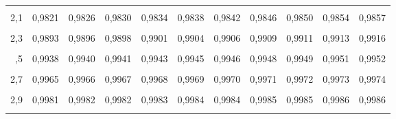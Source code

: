 \documentclass[
  ngerman,
]{article}
\begin{document}
\begin{table}[!h]
{\begin{tabular}{>{}r|rrrrrrrrrr}
\addlinespace
\cellcolor{gray!6}{2,0} & \cellcolor{gray!6}{0,9772} & \cellcolor{gray!6}{0,9778} & \cellcolor{gray!6}{0,9783} & \cellcolor{gray!6}{0,9788} & \cellcolor{gray!6}{0,9793} & \cellcolor{gray!6}{0,9798} & \cellcolor{gray!6}{0,9803} & \cellcolor{gray!6}{0,9808} & \cellcolor{gray!6}{0,9812} & \cellcolor{gray!6}{0,9817}\\
2,1 & 0,9821 & 0,9826 & 0,9830 & 0,9834 & 0,9838 & 0,9842 & 0,9846 & 0,9850 & 0,9854 & 0,9857\\
\cellcolor{gray!6}{2,2} & \cellcolor{gray!6}{0,9861} & \cellcolor{gray!6}{0,9864} & \cellcolor{gray!6}{0,9868} & \cellcolor{gray!6}{0,9871} & \cellcolor{gray!6}{0,9875} & \cellcolor{gray!6}{0,9878} & \cellcolor{gray!6}{0,9881} & \cellcolor{gray!6}{0,9884} & \cellcolor{gray!6}{0,9887} & \cellcolor{gray!6}{0,9890}\\
2,3 & 0,9893 & 0,9896 & 0,9898 & 0,9901 & 0,9904 & 0,9906 & 0,9909 & 0,9911 & 0,9913 & 0,9916\\
\cellcolor{gray!6}{2,4} & \cellcolor{gray!6}{0,9918} & \cellcolor{gray!6}{0,9920} & \cellcolor{gray!6}{0,9922} & \cellcolor{gray!6}{0,9925} & \cellcolor{gray!6}{0,9927} & \cellcolor{gray!6}{0,9929} & \cellcolor{gray!6}{0,9931} & \cellcolor{gray!6}{0,9932} & \cellcolor{gray!6}{0,9934} & \cellcolor{gray!6}{0,9936}\\
\addlinespace
2,5 & 0,9938 & 0,9940 & 0,9941 & 0,9943 & 0,9945 & 0,9946 & 0,9948 & 0,9949 & 0,9951 & 0,9952\\
\cellcolor{gray!6}{2,6} & \cellcolor{gray!6}{0,9953} & \cellcolor{gray!6}{0,9955} & \cellcolor{gray!6}{0,9956} & \cellcolor{gray!6}{0,9957} & \cellcolor{gray!6}{0,9959} & \cellcolor{gray!6}{0,9960} & \cellcolor{gray!6}{0,9961} & \cellcolor{gray!6}{0,9962} & \cellcolor{gray!6}{0,9963} & \cellcolor{gray!6}{0,9964}\\
2,7 & 0,9965 & 0,9966 & 0,9967 & 0,9968 & 0,9969 & 0,9970 & 0,9971 & 0,9972 & 0,9973 & 0,9974\\
\cellcolor{gray!6}{2,8} & \cellcolor{gray!6}{0,9974} & \cellcolor{gray!6}{0,9975} & \cellcolor{gray!6}{0,9976} & \cellcolor{gray!6}{0,9977} & \cellcolor{gray!6}{0,9977} & \cellcolor{gray!6}{0,9978} & \cellcolor{gray!6}{0,9979} & \cellcolor{gray!6}{0,9979} & \cellcolor{gray!6}{0,9980} & \cellcolor{gray!6}{0,9981}\\
2,9 & 0,9981 & 0,9982 & 0,9982 & 0,9983 & 0,9984 & 0,9984 & 0,9985 & 0,9985 & 0,9986 & 0,9986\\
\addlinespace
\cellcolor{gray!6}{3,0} & \cellcolor{gray!6}{0,9987} & \cellcolor{gray!6}{0,9987} & \cellcolor{gray!6}{0,9987} & \cellcolor{gray!6}{0,9988} & \cellcolor{gray!6}{0,9988} & \cellcolor{gray!6}{0,9989} & \cellcolor{gray!6}{0,9989} & \cellcolor{gray!6}{0,9989} & \cellcolor{gray!6}{0,9990} & \cellcolor{gray!6}{0,9990}\\
\bottomrule
\end{tabular}}
\end{table}
\end{document}
